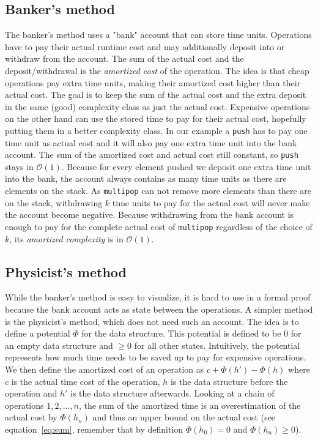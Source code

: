 \documentclass[sigplan,screen,review,anonymous]{acmart}
\renewcommand\O[1]{$\mathcal{O}(#1)$}
\begin{document}
\subsection{Banker's method}\label{sec:banker}

The banker's method uses a "bank" account that can store time units. Operations have to pay their actual runtime cost and may additionally deposit into or withdraw from the account. The sum of the actual cost and the deposit/withdrawal is the \textit{amortized cost} of the operation. The idea is that cheap operations pay extra time units, making their amortized cost higher than their actual cost. The goal is to keep the sum of the actual cost and the extra deposit in the same (good) complexity class as just the actual cost. Expensive operations on the other hand can use the stored time to pay for their actual cost, hopefully putting them in a better complexity class. In our example a \texttt{push} has to pay one time unit as actual cost and it will also pay one extra time unit into the bank account. The sum of the amortized cost and actual cost still constant, so \texttt{push} stays in \O{1}. Because for every element pushed we deposit one extra time unit into the bank, the account always contains as many time units as there are elements on the stack. As \texttt{multipop} can not remove more elements than there are on the stack, withdrawing $k$ time units to pay for the actual cost will never make the account become negative. Because withdrawing from the bank account is enough to pay for the complete actual cost of \texttt{multipop} regardless of the choice of $k$, its \textit{amortized complexity} is in \O{1}.

\subsection{Physicist's method}\label{sec:physicist}

While the banker's method is easy to visualize, it is hard to use in a formal proof because the bank account acts as state between the operations. A simpler method is the physicist's method, which does not need such an account. The idea is to define a potential $\Phi$ for the data structure. This potential is defined to be $0$ for an empty data structure and $\ge 0$ for all other states. Intuitively, the potential represents how much time needs to be saved up to pay for expensive operations. We then define the amortized cost of an operation as $c + \Phi(h') - \Phi(h)$ where $c$ is the actual time cost of the operation, $h$ is the data structure before the operation and $h'$ is the data structure afterwards. Looking at a chain of operations $1, 2, ..., n$, the sum of the amortized time is an overestimation of the actual cost by $\Phi(h_n)$ and thus an upper bound on the actual cost (see equation~\ref{eq:sum}, remember that by definition $\Phi(h_0) = 0$ and $\Phi(h_n) \ge 0$).
\end{document}
